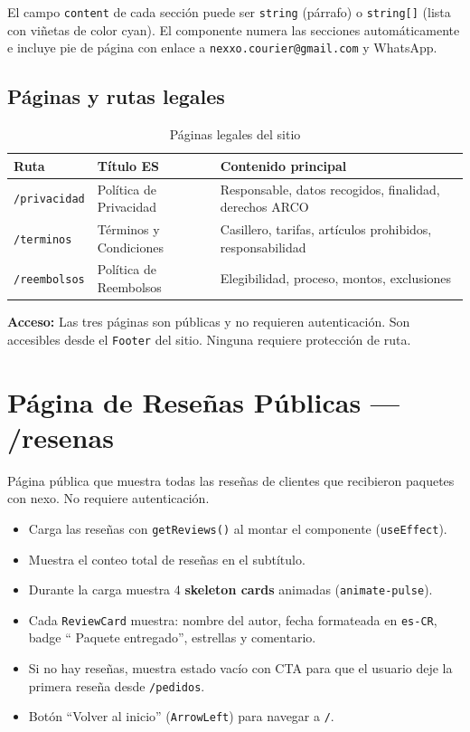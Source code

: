 \documentclass[12pt,a4paper]{article}
\begin{document}
El campo \texttt{content} de cada sección puede ser \texttt{string} (párrafo) o
\texttt{string[]} (lista con viñetas de color cyan). El componente numera las secciones
automáticamente e incluye pie de página con enlace a \texttt{nexxo.courier@gmail.com}
y WhatsApp.

\subsection{Páginas y rutas legales}

\begin{table}[H]
\centering
\begin{tabular}{@{}lll@{}}
\toprule
\textbf{Ruta} & \textbf{Título ES} & \textbf{Contenido principal} \\
\midrule
\texttt{/privacidad} & Política de Privacidad & Responsable, datos recogidos, finalidad, derechos ARCO \\
\texttt{/terminos}   & Términos y Condiciones & Casillero, tarifas, artículos prohibidos, responsabilidad \\
\texttt{/reembolsos} & Política de Reembolsos & Elegibilidad, proceso, montos, exclusiones \\
\bottomrule
\end{tabular}
\caption{Páginas legales del sitio}
\end{table}

\begin{nexobox}
\textbf{Acceso:} Las tres páginas son públicas y no requieren autenticación.
Son accesibles desde el \texttt{Footer} del sitio. Ninguna requiere protección de ruta.
\end{nexobox}

\section{Página de Reseñas Públicas --- /resenas}

Página pública que muestra todas las reseñas de clientes que recibieron paquetes con
nexo. No requiere autenticación.

\begin{itemize}
  \item Carga las reseñas con \texttt{getReviews()} al montar el componente
    (\texttt{useEffect}).
  \item Muestra el conteo total de reseñas en el subtítulo.
  \item Durante la carga muestra 4 \textbf{skeleton cards} animadas (\texttt{animate-pulse}).
  \item Cada \texttt{ReviewCard} muestra: nombre del autor, fecha formateada en
    \texttt{es-CR}, badge ``\checkmark{} Paquete entregado'', estrellas y comentario.
  \item Si no hay reseñas, muestra estado vacío con CTA para que el usuario deje la
    primera reseña desde \texttt{/pedidos}.
  \item Botón ``Volver al inicio'' (\texttt{ArrowLeft}) para navegar a \texttt{/}.
\end{itemize}
\end{document}
